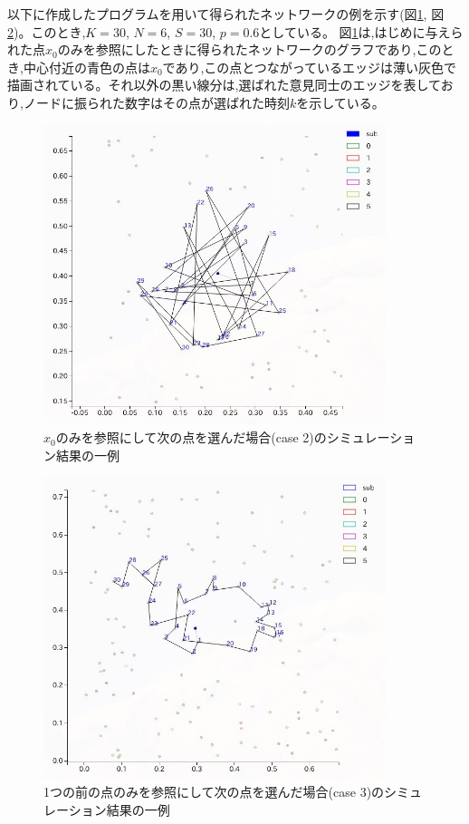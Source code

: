 以下に作成したプログラムを用いて得られたネットワークの例を示す(図\ref{fig:f9}, 図\ref{fig:f10})。このとき,$K=30$, $N=6$, $S=30$, $p=0.6$としている。
図\ref{fig:f9}は,はじめに与えられた点$x_{0}$のみを参照にしたときに得られたネットワークのグラフであり,このとき,中心付近の青色の点は$x_{0}$であり,この点とつながっているエッジは薄い灰色で描画されている。それ以外の黒い線分は,選ばれた意見同士のエッジを表しており,ノードに振られた数字はその点が選ばれた時刻$k$を示している。
\begin{figure}[H]
    \begin{center}
        \includegraphics[width=10cm]{../simple3/case_2.jpg}
        \caption{$x_{0}$のみを参照にして次の点を選んだ場合(case 2)のシミュレーション結果の一例}
        \label{fig:f9}
    \end{center}
\end{figure}
\begin{figure}[H]
    \begin{center}
        \includegraphics[width=10cm]{../simple3/case_3.jpg}
        \caption{1つの前の点のみを参照にして次の点を選んだ場合(case 3)のシミュレーション結果の一例}
        \label{fig:f10}
    \end{center}
\end{figure}
